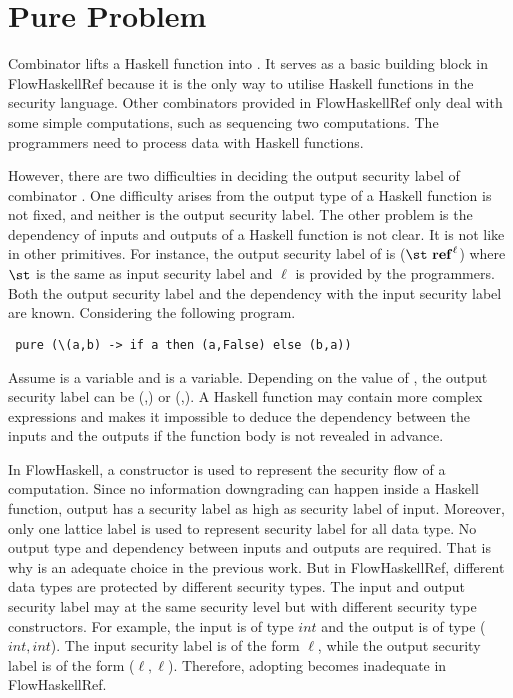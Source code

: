 
\section{Pure Problem}
\label{chap3:pure}
Combinator  lifts a Haskell function into . 
It serves as a basic building block in FlowHaskellRef because it is the only way to
utilise Haskell functions in the security language. Other combinators provided in
FlowHaskellRef only deal with some simple computations, such as sequencing two computations.
The programmers need  to process data with Haskell functions.

However, there are two difficulties in deciding the output security label of combinator .
One difficulty arises from the output type of a Haskell function is not fixed, and neither is the output
security label. The other problem is the dependency of inputs and outputs of a Haskell function is not clear.
It is not like in other primitives. For instance, the output security label of  is
($\st~\mathbf{ref}^\ell$) where $\st$ is the same as input security label and $\ell$ is provided by
the programmers. Both the output security label and the dependency with the input security label
are known. Considering the following program.
\begin{verbatim}
 pure (\(a,b) -> if a then (a,False) else (b,a))
\end{verbatim}
Assume  is a  variable and  is a  variable. Depending on the value of ,
the output security label can be (,) or (,). A Haskell function may
contain more complex expressions and makes it impossible to deduce the dependency between
the inputs and the outputs if the function body is not revealed in advance.

In FlowHaskell, a constructor  is used to represent the security flow of a  computation. Since no 
information downgrading can happen inside a Haskell function, output has a security label as high as
security label of input. Moreover, only one lattice label is used to represent security label for all
data type. No output type and dependency between inputs and outputs are required.
That is why  is an adequate choice in the previous work. 
But in FlowHaskellRef, different data types are protected by different security types. The input and output
security label may at the same security level but with different security type constructors. 
For example, the input is of type $int$ and the output is of type ($int,int$). The input security label
is of the form $\ell$, while the output security label is of the form ($\ell,\ell$).
Therefore, adopting  becomes inadequate in FlowHaskellRef.

